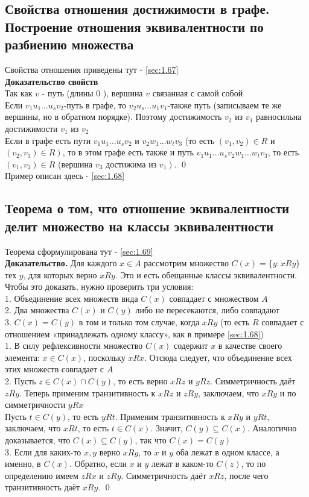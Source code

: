 \documentclass[a4paper]{article}
\begin{document}
\subsection{Свойства отношения достижимости в графе. Построение отношения эквивалентности по разбиению множества}
Свойства отношения приведены тут - \ref{sec:1.67}\\[2mm]
\textbf{Доказательство свойств}\\[2mm]
Так как $v$ - путь (длины 0 ), вершина $v$ связанная с самой собой\\[2mm]
Если $v_{1} u_{1} \ldots u_{s} v_{2}$-путь в графе, то $v_{2} u_{s} \ldots u_{1} v_{1}$-также путь (записываем те же вершины, но в обратном порядке). Поэтому достижимость $v_{2}$ из $v_{1}$ равносильна достижимости $v_{1}$ из $v_{2}$\\[2mm]
 Если в графе есть пути $v_{1} u_{1} \ldots u_{s} v_{2}$ и $v_{2} w_{1} \ldots w_{t} v_{3}$ (то есть $\left(v_{1}, v_{2}\right) \in R$ и $\left.\left(v_{2}, v_{3}\right) \in R\right)$, то в этом графе есть также и путь $v_{1} u_{1} \ldots u_{s} v_{2} w_{1} \ldots w_{t} v_{3}$, то есть $\left(v_{1}, v_{3}\right) \in R$ (вершина $v_{3}$ достижима из $\left.v_{1}\right)$. \qed\\[2mm]
Пример описан здесь - \ref{sec:1.68}
\subsection{Теорема о том, что отношение эквивалентности делит множество на классы эквивалентности}
Теорема сформулирована тут - \ref{sec:1.69}\\[2mm]
\textbf{Доказательство.} Для каждого $x \in A$ рассмотрим множество $C(x)=\{y: x R y\}$ тех $y$, для которых верно $x R y$. Это и есть обещанные классы эквивалентности. Чтобы это доказать, нужно проверить три условия:\\[2mm]
 1. Объединение всех множеств вида $C(x)$ совпадает с множеством $A$\\[2mm]
 2. Два множества $C(x)$ и $C(y)$ либо не пересекаются, либо совпадают\\[2mm]
 3. $C(x)=C(y)$ в том и только том случае, когда $x R y$ (то есть $R$ совпадает с отношением «принадлежать одному классу», как в примере \ref{sec:1.68})\\[2mm]
 1. В силу рефлексивности множество $C(x)$ содержит $x$ в качестве своего элемента: $x \in C(x)$, поскольку $x R x$. Отсюда следует, что объединение всех этих множеств совпадает с $A$\\[2mm]
2. Пусть $z \in C(x) \cap C(y)$, то есть верно $x R z$ и $y R z$. Симметричность даёт $z R y$. Теперь применим транзитивность к $x R z$ и $z R y$, заключаем, что $x R y$ и по симметричности $y R x$\\[2mm]
Пусть $t \in C(y)$, то есть $y R t$. Применим транзитивность к $x R y$ и $y R t$, заключаем, что $x R t$, то есть $t \in C(x)$. Значит, $C(y) \subseteq C(x)$. Аналогично доказывается, что $C(x) \subseteq C(y)$, так что $C(x)=C(y)$\\[2mm]
3. Если для каких-то $x, y$ верно $x R y$, то $x$ и $y$ оба лежат в одном классе, а именно, в $C(x)$. Обратно, если $x$ и $y$ лежат в каком-то $C(z)$, то по определению имеем $z R x$ и $z R y$. Симметричность даёт $x R z$, после чего транзитивность даёт $x R y$. \qed
\end{document}
